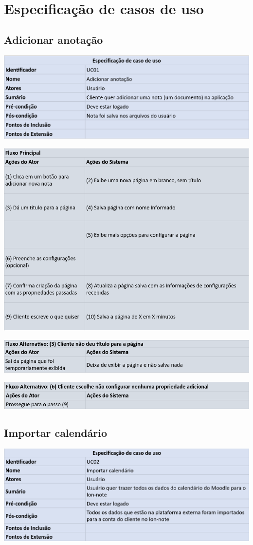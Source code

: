 \documentclass[
	12pt,				%
	openright,			%
	oneside,			    %
	a4paper,				%
	english,			%
	french,			%
	spanish,			%
	brazil			%
	]{abntex2}
\begin{document}
\section{Especificação de casos de uso}
\subsection{Adicionar anotação}
\includegraphics[scale=0.4]{Imagens/UC1-DESC.png}

\includegraphics[scale=0.4]{Imagens/UC1-FP.png}

\includegraphics[scale=0.4]{Imagens/UC1-FA1.png}

\includegraphics[scale=0.4]{Imagens/UC1-FA2.png}

\subsection{Importar calendário}
\includegraphics[scale=0.4]{Imagens/UC2-DESC.png}
\end{document}
